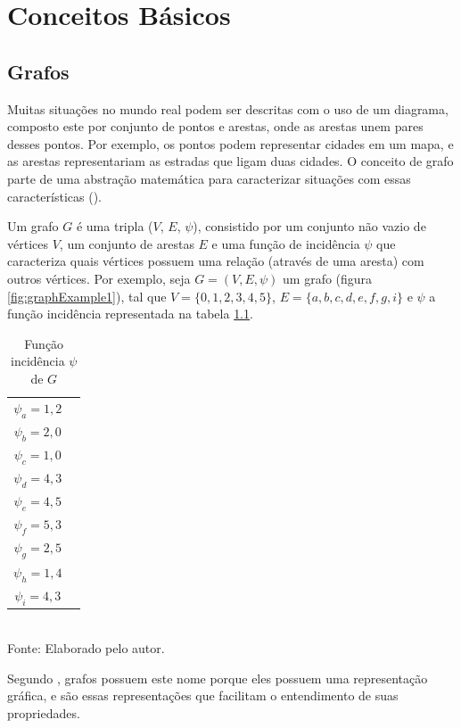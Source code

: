 \chapter{Conceitos Básicos}

\section{Grafos}
Muitas situações no mundo real podem ser descritas com o uso de um diagrama, composto este por conjunto de pontos e arestas, onde as arestas unem pares desses pontos. Por exemplo, os pontos podem representar cidades em um mapa, e as arestas representariam as estradas que ligam duas cidades. O conceito de grafo parte de uma abstração matemática para caracterizar situações com essas características (\cite{Bondy1976}).

Um grafo $G$ é uma tripla ($V$, $E$, $\psi$), consistido por um conjunto não vazio de vértices $V$, um conjunto de arestas $E$ e uma função de incidência $\psi$ que caracteriza quais vértices possuem uma relação (através de uma aresta) com outros vértices. Por exemplo, seja $G = (V, E, \psi)$ um grafo (figura \ref{fig:graphExample1}), tal que $V = \{0, 1, 2, 3, 4, 5\}$, $E = \{a, b, c, d, e, f, g, i\}$ e $\psi$ a função incidência representada na tabela \ref{tab:graphExample1}.

\begin{table}[ht!]
\caption{Função incidência $\psi$ de $G$}
\label{tab:graphExample1}
\centering
\begin{tabular}{| c | c |}
\hline
    $\psi_a = 1,2$\\ 
    $\psi_b = 2,0$\\ 
    $\psi_c = 1,0$\\ 
    $\psi_d = 4,3$\\
    $\psi_e = 4,5$\\
    $\psi_f = 5,3$\\
    $\psi_g = 2,5$\\
    $\psi_h = 1,4$\\
    $\psi_i = 4,3$\\
\hline
\end{tabular}
{\fontsize{11pt}{\baselineskip}\selectfont
\\Fonte: Elaborado pelo autor.
}
\end{table}

Segundo \cite{Bondy1976}, grafos possuem este nome porque eles possuem uma representação gráfica, e são essas representações que facilitam o entendimento de suas propriedades.

